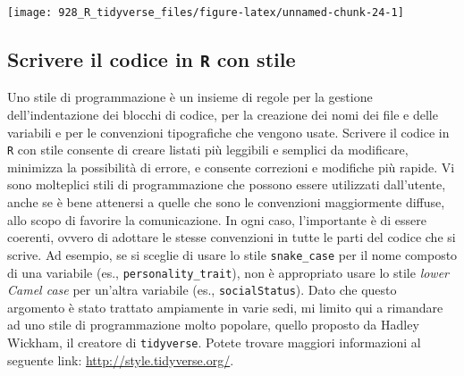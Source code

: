 \documentclass[
  10pt,
  italian,
  a4paper,
  extrafontsizes,onecolumn,openright
  ]{memoir}
\makeatletter
\newcommand{\MemoirChapStyle}{daleif1}
\newcommand{\MemoirPageStyle}{Ruled}
\newlength\widthw %
\newcommand*{\SmallMargins}{
  \setlrmarginsandblock{1.5in}{1.5in}{*}
  \setmarginnotes{0.1in}{0.1in}{0.1in}
 \setulmarginsandblock{1.5in}{1in}{*}
  \checkandfixthelayout
  \ch@ngetext
  \clearpage
  \setlength{\widthw}{\textwidth+\marginparsep+\marginparwidth}
  \footnotesatfoot
  \chapterstyle{\MemoirChapStyle}  %
  \pagestyle{\MemoirPageStyle}
}
\newcommand{\LargeMargins}{\SmallMargins}
\makeatother
\begin{document}
\begin{center}\texttt{[image: 928\_R\_tidyverse\_files/figure-latex/unnamed-chunk-24-1]} \end{center}

\hypertarget{scrivere-il-codice-in-r-con-stile}{%
\subsection{\texorpdfstring{Scrivere il codice in \texttt{R} con stile}{Scrivere il codice in R con stile}}\label{scrivere-il-codice-in-r-con-stile}}

Uno stile di programmazione è un insieme di regole per la gestione dell'indentazione dei blocchi di codice, per la creazione dei nomi dei file e delle variabili e per le convenzioni tipografiche che vengono usate. Scrivere il codice in \texttt{R} con stile consente di creare listati più leggibili e semplici da modificare, minimizza la possibilità di errore, e consente correzioni e modifiche più rapide. Vi sono molteplici stili di programmazione che possono essere utilizzati dall'utente, anche se è bene attenersi a quelle che sono le convenzioni maggiormente diffuse, allo scopo di favorire la comunicazione. In ogni caso, l'importante è di essere coerenti, ovvero di adottare le stesse convenzioni in tutte le parti del codice che si scrive. Ad esempio, se si sceglie di usare lo stile \texttt{snake\_case} per il nome composto di una variabile (es., \texttt{personality\_trait}), non è appropriato usare lo stile \emph{lower Camel case} per un'altra variabile (es., \texttt{socialStatus}). Dato che questo argomento è stato trattato ampiamente in varie sedi, mi limito qui a rimandare ad uno stile di programmazione molto popolare, quello proposto da Hadley Wickham, il creatore di \texttt{tidyverse}. Potete trovare maggiori informazioni al seguente link: \url{http://style.tidyverse.org/}.



\backmatter
\SmallMargins

\printbibliography
\onecolumn




\cleardoublepage
\LargeMargins
\listoffigures


\end{document}
